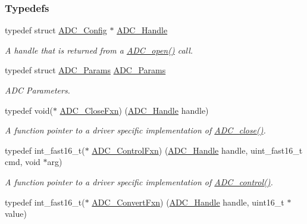 \subsubsection*{Typedefs}
\begin{DoxyCompactItemize}
\item 
typedef struct \hyperlink{struct_a_d_c___config}{A\+D\+C\+\_\+\+Config} $\ast$ \hyperlink{_a_d_c_8h_ac98b1222559c172df43505d672e1376c}{A\+D\+C\+\_\+\+Handle}
\begin{DoxyCompactList}\small\item\em A handle that is returned from a \hyperlink{_a_d_c_8h_a9f3e5f311cda4df63e70660651b9314e}{A\+D\+C\+\_\+open()} call. \end{DoxyCompactList}\item 
typedef struct \hyperlink{struct_a_d_c___params}{A\+D\+C\+\_\+\+Params} \hyperlink{_a_d_c_8h_a1cd6c9decc95ce2f6acb5eeb3cc72eb2}{A\+D\+C\+\_\+\+Params}
\begin{DoxyCompactList}\small\item\em A\+D\+C Parameters. \end{DoxyCompactList}\item 
typedef void($\ast$ \hyperlink{_a_d_c_8h_a42f6ff234d06fb71647510e04be8a3bf}{A\+D\+C\+\_\+\+Close\+Fxn}) (\hyperlink{_a_d_c_8h_ac98b1222559c172df43505d672e1376c}{A\+D\+C\+\_\+\+Handle} handle)
\begin{DoxyCompactList}\small\item\em A function pointer to a driver specific implementation of \hyperlink{_a_d_c_8h_adb49f74bdef5e3e45ee5de306c5dfc08}{A\+D\+C\+\_\+close()}. \end{DoxyCompactList}\item 
typedef int\+\_\+fast16\+\_\+t($\ast$ \hyperlink{_a_d_c_8h_af9c178e22b377d9cf5eb7d2a1a072f12}{A\+D\+C\+\_\+\+Control\+Fxn}) (\hyperlink{_a_d_c_8h_ac98b1222559c172df43505d672e1376c}{A\+D\+C\+\_\+\+Handle} handle, uint\+\_\+fast16\+\_\+t cmd, void $\ast$arg)
\begin{DoxyCompactList}\small\item\em A function pointer to a driver specific implementation of \hyperlink{_a_d_c_8h_af4be7e5e4f5cc931f4501a542d689c32}{A\+D\+C\+\_\+control()}. \end{DoxyCompactList}\item 
typedef int\+\_\+fast16\+\_\+t($\ast$ \hyperlink{_a_d_c_8h_a552f2f752fbfc1b2af7551e55e392a42}{A\+D\+C\+\_\+\+Convert\+Fxn}) (\hyperlink{_a_d_c_8h_ac98b1222559c172df43505d672e1376c}{A\+D\+C\+\_\+\+Handle} handle, uint16\+\_\+t $\ast$value)

\end{DoxyCompactItemize}
